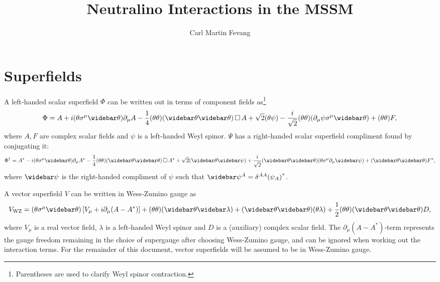 \documentclass[english, notitlepage]{article}
\title{Neutralino Interactions in the MSSM}
\author{Carl Martin Fevang}
\begin{document}
\maketitle

\section{Superfields}
    A left-handed scalar superfield $\Phi$ can be written out in terms of component
    fields as\footnote{Parentheses are used to clarify Weyl spinor contraction.}
    \begin{align}
        \Phi = A + i(\theta\sigma^\mu\wbar\theta) \partial_\mu A - \frac{1}{4} (\theta\theta)(\wbar\theta\wbar\theta) \dA A +
        \sqrt{2} (\theta\psi) - \frac{i}{\sqrt{2}} (\theta\theta) (\partial_\mu \psi \sigma^\mu \wbar\theta) + (\theta\theta) F,
    \end{align}
    where $A, F$ are complex scalar fields and $\psi$ is a left-handed Weyl spinor. $\Psi$ has a right-handed scalar superfield compliment found by conjugating it:
    \begin{align}
        \Phi^\dag = A^* - i(\theta\sigma^\mu\wbar\theta) \partial_\mu A^* - \frac{1}{4} (\theta\theta)(\wbar\theta\wbar\theta) \dA A^* +
        \sqrt{2} (\wbar\theta\wbar\psi) + \frac{i}{\sqrt{2}} (\wbar\theta\wbar\theta)
        (\theta \sigma^\mu \partial_\mu \wbar\psi) + (\wbar\theta\wbar\theta) F^*,
    \end{align}
    where $\wbar\psi$ is the right-handed compliment of $\psi$ such that $\wbar\psi^{\dot A} = \delta^{\dot A A} {(\psi_A)}^*$.

    A vector superfield $V$ can be written in Wess-Zumino gauge as
    \begin{align}
        \msub{V}{WZ} = (\theta\sigma^\mu\wbar\theta) \bclosed{V_\mu + i\partial_\mu (A - A^*)} + (\theta\theta) (\wbar\theta\wbar\lambda) +
        (\wbar\theta\wbar\theta)(\theta\lambda) + \frac{1}{2}
        (\theta\theta)(\wbar\theta\wbar\theta) D,
    \end{align}
    where $V_\mu$ is a real vector field, $\lambda$ is a left-handed Weyl spinor and $D$ is a (auxiliary) complex scalar field. The $\partial_\mu (A-A^*)$-term represents the gauge freedom remaining in the choice of
    supergauge after choosing Wess-Zumino gauge, and can be ignored when working
    out the interaction terms. For the remainder of this document, vector superfields will be assumed to be in Wess-Zumino gauge.
\end{document}
